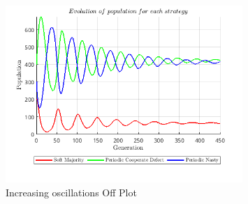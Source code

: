 \documentclass[12pt]{report}
\begin{document}
\begin{figure}[H]
    \centering
    \includegraphics[width=0.8\textwidth]{increasing_oscillations_off.png}
    \caption{Increasing oscillations Off Plot}
\end{figure}

\newpage
\end{document}
